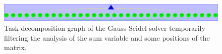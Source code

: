 \documentclass[12pt, a4paper]{article}
\begin{document}
\begin{figure}[H]
	\centering
	\includegraphics[scale=0.15]{./images/tareador-gauss-seidel-2b-sum-vector}
	\caption{Task decomposition graph of the Gauss-Seidel solver temporarily filtering the analysis of the sum variable and some positions of the matrix.}
\end{figure}

\label{sec:TDGAllDisablesGaussSeidel}
\end{document}
